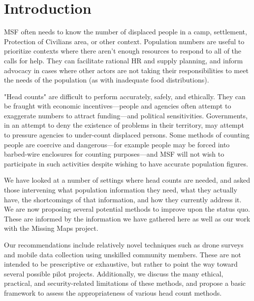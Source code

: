 \documentclass[a4paper,12pt,twoside]{article}
\begin{document}
\newpage
\section{Introduction}
\begin{multicols}{2}
MSF often needs to know the number of displaced people in a camp, settlement, Protection of Civilians area, or other context. Population numbers are useful to prioritize contexts where there aren't enough resources to respond to all of the calls for help. They can facilitate rational HR and supply planning, and inform advocacy in cases where other actors are not taking their responsibilities to meet the needs of the population (as with inadequate food distributions). 

"Head counts" are difficult to perform accurately, safely, and ethically. They can be fraught with economic incentives---people and agencies often attempt to exaggerate numbers to attract funding---and political sensitivities. Governments, in an attempt to deny the existence of problems in their territory, may attempt to pressure agencies to under-count displaced persons. Some methods of counting people are coercive and dangerous---for example people may be forced into barbed-wire enclosures for counting purposes---and MSF will not wish to participate in such activities despite wishing to have accurate population figures. 

We have looked at a number of settings where head counts are needed, and asked
those intervening what population information they need, what they actually have, the shortcomings of that information, and how they currently address it. We are now proposing several potential methods to improve upon the status quo. These are informed by the information we have gathered here as well as our work with the Missing Maps project.

Our recommendations include relatively novel techniques such as drone surveys and mobile data collection using unskilled community members. These are not intended to be prescriptive or exhaustive, but rather to point the way toward several possible pilot projects. Additionally, we discuss the many ethical, practical, and security-related limitations of these methods, and propose a basic framework to assess the appropriateness of various head count methods.

\end{multicols}
\end{document}
